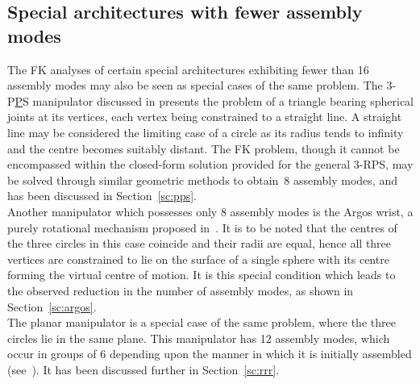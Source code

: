 \documentclass[DD]{iitmdiss}
\newcommand{\mref}[1]{\ref{#1}}
\newcommand{\mcite}[1]{\cite{#1}}
\begin{document}
\subsection{Special architectures with fewer assembly modes}
%
The FK analyses of certain special architectures exhibiting fewer than 16 assembly modes may also be seen as special cases of the same problem. The 3-P\underline{P}S manipulator discussed in \mcite{ruggiu2009} presents the problem of a triangle bearing spherical joints at its vertices, each vertex being constrained to a straight line. A straight line may be considered the limiting case of a circle as its radius tends to infinity and the centre becomes suitably distant. The FK problem, though it cannot be encompassed within the closed-form solution provided for the general 3-RPS, may be solved through similar geometric methods to obtain~8 assembly modes, and has been discussed in Section~\mref{sc:pps}.\\
Another manipulator which possesses only 8 assembly modes is the Argos wrist, a purely rotational mechanism proposed in~\mcite{vischer2000}. It is to be noted that the centres of the three circles in this case coincide and their radii are equal, hence all three vertices are constrained to lie on the surface of a single sphere with its centre forming the virtual centre of motion. It is this special condition which leads to the observed reduction in the number of assembly modes, as shown in Section~\mref{sc:argos}.\\
The planar \rrr manipulator is a special case of the same problem, where the three circles lie in the same plane. This manipulator has 12 assembly modes, which occur in groups of 6 depending upon the manner in which it is initially assembled (see~\mcite{baskar2017}). It has been discussed further in Section~\mref{sc:rrr}.
%
\end{document}
